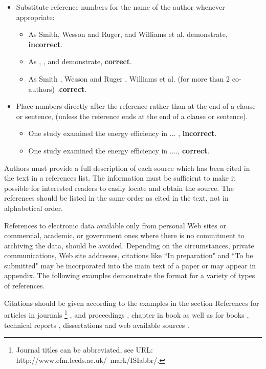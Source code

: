 \documentclass{ECOS_2021}
\begin{document}
\begin{itemize}
    \item Substitute reference numbers for the name of the author whenever appropriate:
    \begin{itemize}
        \item As Smith, Wesson and Ruger, and Williams et al. demonstrate, {\bf incorrect}.
        \item As \cite{journal}, \cite{proceedings}, and \cite{chapter} demonstrate, {\bf correct}.
        \item As Smith \cite{journal}, Wesson and Ruger \cite{proceedings}, Williams et al. (for more than 2 co-authors) \cite{chapter}.{\bf correct}.
    \end{itemize}
    \item Place numbers directly after the reference rather than at the end of a clause or sentence, (unless the reference ends at the end of a clause or sentence).
    \begin{itemize}
        \item One study examined the energy efficiency in ... \cite{journal}, {\bf incorrect}.
        \item One study \cite{journal} examined the energy efficiency in ...., {\bf correct}.
    \end{itemize}
\end{itemize}

Authors must provide a full description of each source which has been cited in the text in a references list. The information must be sufficient to make it possible for interested readers to easily locate and obtain the source. The references should be listed in the same order as cited in the text, not in alphabetical order.

References to electronic data available only from personal Web sites or commercial, academic, or government ones where there is no commitment to archiving the data, should be avoided. Depending on the circumstances, private communications, Web site addresses, citations like ``In preparation" and ``To be submitted" may be incorporated into the main text of a paper or may appear in appendix. The following examples demonstrate the format for a variety of types of references.

Citations should be given according to the examples in the section References for articles in journals \footnote{Journal titles can be abbreviated, see URL: http://www.efm.leeds.ac.uk/~mark/ISIabbr/.} \cite{journal}, \cite{journal2} and proceedings \cite{proceedings}, chapter in book \cite{chapter} as well as for books \cite{books}, technical reports \cite{report}, dissertations \cite{dissertation} and web available sources \cite{web_references}.
\end{document}
